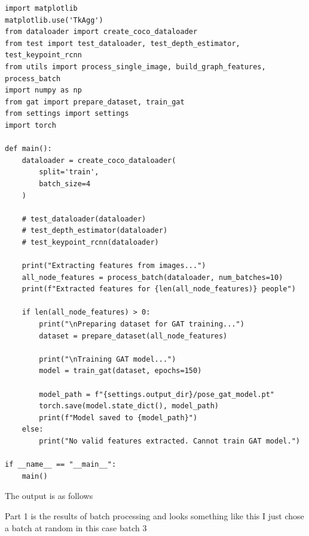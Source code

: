 \begin{lstlisting}[style=pythonstyle,title={Main file for initial setup May},label={code:init}]
import matplotlib
matplotlib.use('TkAgg')
from dataloader import create_coco_dataloader
from test import test_dataloader, test_depth_estimator, test_keypoint_rcnn
from utils import process_single_image, build_graph_features, process_batch
import numpy as np
from gat import prepare_dataset, train_gat
from settings import settings
import torch

def main():
    dataloader = create_coco_dataloader(
        split='train', 
        batch_size=4
    )
    
    # test_dataloader(dataloader)
    # test_depth_estimator(dataloader)
    # test_keypoint_rcnn(dataloader)
    
    print("Extracting features from images...")
    all_node_features = process_batch(dataloader, num_batches=10)
    print(f"Extracted features for {len(all_node_features)} people")
    
    if len(all_node_features) > 0:
        print("\nPreparing dataset for GAT training...")
        dataset = prepare_dataset(all_node_features)
        
        print("\nTraining GAT model...")
        model = train_gat(dataset, epochs=150)
        
        model_path = f"{settings.output_dir}/pose_gat_model.pt"
        torch.save(model.state_dict(), model_path)
        print(f"Model saved to {model_path}")
    else:
        print("No valid features extracted. Cannot train GAT model.")
    
if __name__ == "__main__":
    main()
\end{lstlisting}

The output is as follows

Part 1 is the results of batch processing and looks something like this I just chose a batch at random in this case batch 3

